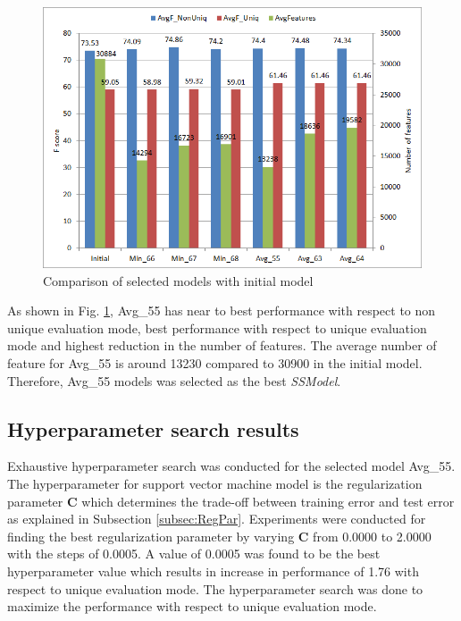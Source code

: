 \begin{figure}
\centering
\includegraphics[scale=0.6]{figures/6ModelsComparison.png}
\caption{Comparison of selected models with initial model}\label{fig:6ModelsComp}
\end{figure}

As shown in Fig. \ref{fig:6ModelsComp}, Avg\_55 has near to best performance with respect to non unique evaluation mode, best performance with respect to unique evaluation mode and highest reduction in the number of features. The average number of feature for Avg\_55 is around 13230 compared to 30900 in the initial model. Therefore, Avg\_55 models was selected as the best \textit{SSModel}.


\subsection{Hyperparameter search results}

Exhaustive hyperparameter search was conducted for the selected model Avg\_55. The hyperparameter for support vector machine model is the regularization parameter $\mathbf{C}$ which determines the trade-off between training error and test error as explained in Subsection \ref{subsec:RegPar}. Experiments were conducted for finding the best regularization parameter by varying $\mathbf{C}$ from 0.0000 to 2.0000 with the steps of 0.0005. A value of 0.0005 was found to be the best hyperparameter value which results in increase in performance of 1.76 with respect to unique evaluation mode. The hyperparameter search was done to  maximize the performance with respect to unique evaluation mode.

